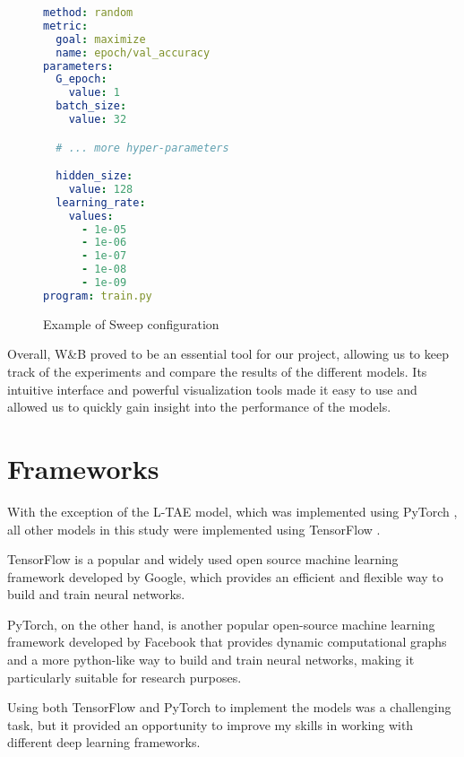 \begin{figure}[H]
\begin{lstlisting}[language=yaml]
method: random
metric:
  goal: maximize
  name: epoch/val_accuracy
parameters:
  G_epoch:
    value: 1
  batch_size:
    value: 32

  # ... more hyper-parameters

  hidden_size:
    value: 128
  learning_rate:
    values:
      - 1e-05
      - 1e-06
      - 1e-07
      - 1e-08
      - 1e-09
program: train.py
\end{lstlisting}
\caption{Example of Sweep configuration}
\end{figure}

Overall, W\&B proved to be an essential tool for our project, allowing us to keep track of the experiments and compare the results of the different models. 
Its intuitive interface and powerful visualization tools made it easy to use and allowed us to quickly gain insight into the performance of the models.


\section{Frameworks}

With the exception of the L-TAE model, which was implemented using PyTorch \cite{NEURIPS2019_9015}, all other models in this study were implemented using TensorFlow \cite{tensorflow2015-whitepaper}.

TensorFlow is a popular and widely used open source machine learning framework developed by Google, which provides an efficient and flexible way to build and train neural networks.

PyTorch, on the other hand, is another popular open-source machine learning framework developed by Facebook that provides dynamic computational graphs and a more python-like way to build and train neural networks, making it particularly suitable for research purposes.

Using both TensorFlow and PyTorch to implement the models was a challenging task, but it provided an opportunity to improve my skills in working with different deep learning frameworks.

